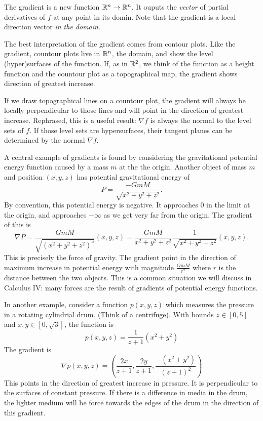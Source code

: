 \documentclass[fleqn,letterpaper]{report}
\begin{document}
The gradient is a new function $\mathbb{R}^n \rightarrow \mathbb{R}^n$. It
ouputs the \emph{vector} of partial derivatives of $f$ at any
point in its domin. Note that the gradient is a local
direction vector \emph{in the domain}. 

The best interpretation of the gradient comes from contour
plots. Like the gradient, countour plots live in $\mathbb{R}^n$, the
domain, and show the level (hyper)surfaces of the function.
If, as in $\mathbb{R}^2$, we think of the function as a height
function and the countour plot as a topographical map, the
gradient shows direction of greatest increase. 

If we draw topographical lines on a countour plot, the
gradient will always be locally perpendicular to those lines
and will point in the direction of greatest increase.
Rephrased, this is a useful result: $\nabla f$ is always the
normal to the level sets of $f$. If those level sets are
hypersurfaces, their tangent planes can be determined by the
normal $\nabla f$. 

\begin{example}
A central example of gradients is found by considering the
gravitational potential energy function caused by a mass $m$
at the the origin. Another object of mass $m$ and
position $(x,y,z)$ has potential gravitational energy of
\begin{equation*}
P = \frac{-GmM}{\sqrt{x^2 + y^2 +z^2}}.
\end{equation*}
By convention, this potential energy is negative. It
approaches $0$ in the limit at the origin, and approaches $-
\infty$ as we get very far from the origin. The gradient of
this is 
\begin{equation*}
\nabla P = \frac{GmM}{\sqrt{(x^2 + y^2 +z^2)^3}} (x, y, z) =
\frac{GmM}{x^2 + y^2 + z^2} \frac{1}{\sqrt{x^2 + y^2 + z^2}}
(x,y,z).
\end{equation*}
This is precisely the force of gravity. The gradient point in
the direction of maximum increase in potential energy with
magnitude $\frac{GmM}{r^2}$ where $r$ is the distance between
the two objects. This is a common situation we will discuss
in Calculus IV: many forces are the result of gradients of
potential energy functions. 
\end{example}

\begin{example}
In another example, consider a function $p(x,y,z)$ which
measures the pressure in a rotating cylindrial drum. (Think
of a centrifuge). With bounds $z \in [0,5]$ and $x,y \in [0,
\sqrt{3}]$, the function is 
\begin{equation*}
p(x,y,z) = \frac{1}{z+1} (x^2 + y^2)
\end{equation*}
The gradient is
\begin{equation*}
\nabla p(x,y,z) = \left( \frac{2x}{z+1}, \frac{2y}{z+1},
\frac{-(x^2 + y^2)}{(z+1)^2} \right)
\end{equation*}
This points in the direction of greatest increase in pressure.
It is perpendicular to the surfaces of constant pressure. If
there is a difference in media in the drum, the lighter medium
will be force towards the edges of the drum in the direction
of this gradient. 
\end{example}
\end{document}
